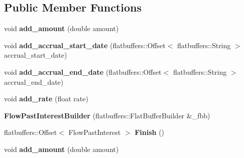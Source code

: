 \subsection*{Public Member Functions}
\begin{DoxyCompactItemize}
\item 
\mbox{\label{structquantra_1_1FlowPastInterestBuilder_abfb3f1094cdfea213e7781eda63bcbbb}} 
void {\bfseries add\+\_\+amount} (double amount)
\item 
\mbox{\label{structquantra_1_1FlowPastInterestBuilder_a833df436fc638950e6ea6f4231adad65}} 
void {\bfseries add\+\_\+accrual\+\_\+start\+\_\+date} (flatbuffers\+::\+Offset$<$ flatbuffers\+::\+String $>$ accrual\+\_\+start\+\_\+date)
\item 
\mbox{\label{structquantra_1_1FlowPastInterestBuilder_a8b5f6d57170526e4e2dc38e0b0864196}} 
void {\bfseries add\+\_\+accrual\+\_\+end\+\_\+date} (flatbuffers\+::\+Offset$<$ flatbuffers\+::\+String $>$ accrual\+\_\+end\+\_\+date)
\item 
\mbox{\label{structquantra_1_1FlowPastInterestBuilder_a77f2d659532b9504b97b24d8ff7d9d49}} 
void {\bfseries add\+\_\+rate} (float rate)
\item 
\mbox{\label{structquantra_1_1FlowPastInterestBuilder_a01ab89dddcba7e96fcc8a8625b57f8b7}} 
{\bfseries Flow\+Past\+Interest\+Builder} (flatbuffers\+::\+Flat\+Buffer\+Builder \&\+\_\+fbb)
\item 
\mbox{\label{structquantra_1_1FlowPastInterestBuilder_a969d3272b1a5281a15cba0c526065a04}} 
flatbuffers\+::\+Offset$<$ Flow\+Past\+Interest $>$ {\bfseries Finish} ()
\item 
\mbox{\label{structquantra_1_1FlowPastInterestBuilder_abfb3f1094cdfea213e7781eda63bcbbb}} 
void {\bfseries add\+\_\+amount} (double amount)
\item 
\mbox{\label{structquantra_1_1FlowPastInterestBuilder_aae758810e62f978acd937bd5e78c15cc}} 

\end{DoxyCompactItemize}
